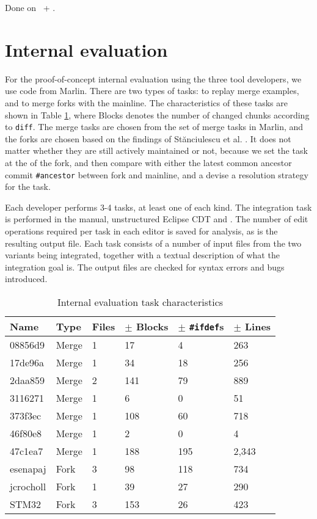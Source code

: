 Done on \busybox~+ \vim.

\section{Internal evaluation}
For the proof-of-concept internal evaluation using the three tool developers, we use code from Marlin. There are two types of tasks: to replay merge examples, and to merge forks with the mainline. The characteristics of these tasks are shown in Table \ref{tab:internalchar}, where Blocks denotes the number of changed chunks according to \texttt{diff}. The merge tasks are chosen from the set of merge tasks in Marlin, and the forks are chosen based on the findings of St\u{a}nciulescu et al. \cite{stanciulescu2015}. It does not matter whether they are still actively maintained or not, because we set the task at the \head of the fork, and then compare with either the latest common ancestor commit \texttt{\#ancestor} between fork and mainline, and a devise a resolution strategy for the task.

Each developer performs 3-4 tasks, at least one of each kind. The integration task is performed in the manual, unstructured Eclipse CDT and \tooln. The number of edit operations required per task in each editor is saved for analysis, as is the resulting output file. Each task consists of a number of input files from the two variants being integrated, together with a textual description of what the integration goal is. The output files are checked for syntax errors and bugs introduced.

\begin{table}[h]
    \centering
    \caption{Internal evaluation task characteristics}
    \label{tab:internalchar}
    \begin{tabular}{lll|lll}
\hline\hline
\textbf{Name} & \textbf{Type} & \textbf{Files} & \textbf{$\pm$ Blocks} & \textbf{$\pm$ \texttt{\#ifdef}s} & \textbf{$\pm$ Lines} \\
\hline
08856d9      & Merge     & 1 & 17    & 4     & 263   \\
17de96a      & Merge     & 1 & 34    & 18    & 256   \\
2daa859      & Merge     & 2 & 141 & 79      & 889   \\
3116271      & Merge     & 1 & 6     & 0     & 51    \\
373f3ec      & Merge     & 1 & 108 & 60      & 718   \\
46f80e8      & Merge     & 1 & 2     & 0     & 4     \\
47c1ea7      & Merge     & 1 & 188   & 195   & 2,343 \\
\hline
esenapaj     & Fork         & 3 & 98    & 118   & 734   \\
jcrocholl    & Fork         & 1 & 39    & 27    & 290   \\
STM32        & Fork         & 3 & 153   & 26    & 423   \\
\hline\hline
    \end{tabular}
\end{table}

